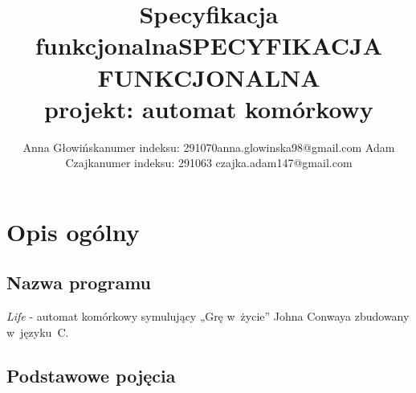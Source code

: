 \documentclass[a4paper,12pt,oneside]{article}
\begin{document}
\makeatother

\title{Specyfikacja funkcjonalna}

\title{SPECYFIKACJA FUNKCJONALNA\\projekt: automat komórkowy}

\author{Anna Głowińska\newline numer indeksu: 291070\newline anna.glowinska98@gmail.com \newline \newline
Adam Czajka\newline numer indeksu: 291063 \newline czajka.adam147@gmail.com}

\maketitle
\tableofcontents
\thispagestyle{fancy}
\newpage
\section{Opis ogólny}

\subsection{Nazwa programu}

\textit{Life} - automat komórkowy symulujący „Grę w~życie” Johna Conwaya zbudowany w~języku~C.

\subsection{Podstawowe pojęcia}
\end{document}
